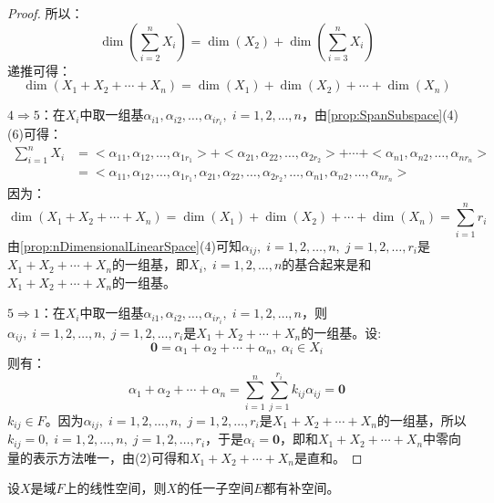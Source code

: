\begin{proof}
	所以：
	\begin{equation*}
		\dim\left(\sum_{i=2}^{n}X_i\right)
		=\dim(X_2)+\dim\left(\sum_{i=3}^{n}X_i\right)
	\end{equation*}
	递推可得：
	\begin{equation*}
		\dim(X_1+X_2+\cdots+X_n)=\dim(X_1)+\dim(X_2)+\cdots+\dim(X_n)
	\end{equation*}\par
	$4\Rightarrow5$：在$X_i$中取一组基$\alpha_{i1},\alpha_{i2},\dots,\alpha_{ir_i},\;i=1,2,\dots,n$，由\cref{prop:SpanSubspace}(4)(6)可得：
	\begin{align*}
		\sum_{i=1}^{n}X_i
		&=<\alpha_{11},\alpha_{12},\dots,\alpha_{1r_1}>+<\alpha_{21},\alpha_{22},\dots,\alpha_{2r_2}>+\cdots+<\alpha_{n1},\alpha_{n2},\dots,\alpha_{nr_n}> \\
		&=<\alpha_{11},\alpha_{12},\dots,\alpha_{1r_1},\alpha_{21},\alpha_{22},\dots,\alpha_{2r_2},\dots,\alpha_{n1},\alpha_{n2},\dots,\alpha_{nr_n}>
	\end{align*}
	因为：
	\begin{equation*}
		\dim(X_1+X_2+\cdots+X_n)=\dim(X_1)+\dim(X_2)+\cdots+\dim(X_n)=\sum_{i=1}^{n}r_i
	\end{equation*}
	由\cref{prop:nDimensionalLinearSpace}(4)可知$\alpha_{ij},\;i=1,2,\dots,n,\;j=1,2,\dots,r_i$是$X_1+X_2+\cdots+X_n$的一组基，即$X_i,\;i=1,2,\dots,n$的基合起来是和$X_1+X_2+\cdots+X_n$的一组基。\par
	$5\Rightarrow1$：在$X_i$中取一组基$\alpha_{i1},\alpha_{i2},\dots,\alpha_{ir_i},\;i=1,2,\dots,n$，则$\alpha_{ij},\;i=1,2,\dots,n,\;j=1,2,\dots,r_i$是$X_1+X_2+\cdots+X_n$的一组基。设:
	\begin{equation*}
		\mathbf{0}=\alpha_1+\alpha_2+\cdots+\alpha_n,\;\alpha_i\in X_i
	\end{equation*}
	则有：
	\begin{equation*}
		\alpha_1+\alpha_2+\cdots+\alpha_n=\sum_{i=1}^{n}\sum_{j=1}^{r_i}k_{ij}\alpha_{ij}=\mathbf{0}
	\end{equation*}
	$k_{ij}\in F$。因为$\alpha_{ij},\;i=1,2,\dots,n,\;j=1,2,\dots,r_i$是$X_1+X_2+\cdots+X_n$的一组基，所以$k_{ij}=0,\;i=1,2,\dots,n,\;j=1,2,\dots,r_i$，于是$\alpha_i=\mathbf{0}$，即和$X_1+X_2+\cdots+X_n$中零向量的表示方法唯一，由(2)可得和$X_1+X_2+\cdots+X_n$是直和。
\end{proof}
\begin{theorem}\label{theo:ExistenceOfComplement}
	设$X$是域$F$上的线性空间，则$X$的任一子空间$E$都有补空间。
\end{theorem}
